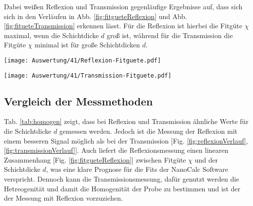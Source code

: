 Dabei weißen Reflexion und Transmission gegenläufige Ergebnisse auf, dass sich sich in den Verläufen in Abb. \ref{fig:fitgueteReflexion} und Abb. \ref{fig:fitueteTransmission} erkennen lässt. Für die Reflexion ist hierbei die Fitgüte $\chi$ maximal, wenn die Schichtdicke $d$ groß ist, während für die Transmission die Fitgüte $\chi$ minimal ist für große Schichtdicken $d$. 
\begin{center}
	\captionsetup{type=figure}
	\texttt{[image: Auswertung/41/Reflexion-Fitguete.pdf]}
	\label{fig:fitgueteReflexion}
\end{center}
\begin{center}
	\captionsetup{type=figure}
	\texttt{[image: Auswertung/41/Transmission-Fitguete.pdf]}
	\label{fig:fitueteTransmission}
\end{center}


\subsection{Vergleich der Messmethoden}
\label{sub:vergleich}

Tab. \ref{tab:homogen} zeigt, dass bei Reflexion und Transmission ähnliche Werte für die Schichtdicke $d$ gemessen werden. Jedoch ist die Messung der Reflexion mit einem besseren Signal möglich als bei der Transmission [Fig. \ref{fig:reflexionVerlauf}, \ref{fig:transmissionVerlauf}]. Auch liefert die Reflexionsmessung einen linearen Zusammenhang [Fig. \ref{fig:fitgueteReflexion}] zwischen Fitgüte $\chi$ und der Schichtdicke $d$, was eine klare Prognose für die Fits der NanoCalc Software verspricht. Dennoch kann die Transmissionsmessung, dafür genutzt werden die Hetreogenität und damit die Homogenität der Probe zu bestimmen und ist der der Messung mit Reflexion vorzuziehen.